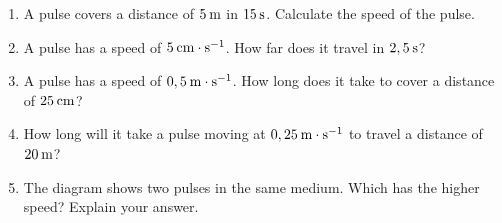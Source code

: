         \label{m38801*id313813}\begin{enumerate}[noitemsep, label=\textbf{\arabic*}. ] 
            \label{m38801*uid7}\item A pulse covers a distance of \begin{math}5\phantom{\rule{2pt}{0ex}}\mathrm{m}\end{math} in \begin{math}15\phantom{\rule{2pt}{0ex}}\mathrm{s}\end{math}. Calculate the speed of the pulse.\newline
            
\label{m38801*uid8}\item A pulse has a speed of \begin{math}5\phantom{\rule{2pt}{0ex}}\mathrm{cm}\ensuremath{\cdot}\mathrm{s}{}^{-1}\end{math}. How far does it travel in \begin{math}2,5\phantom{\rule{2pt}{0ex}}\mathrm{s}\end{math}?\newline
            
\label{m38801*uid9}\item A pulse has a speed of \begin{math}0,5\phantom{\rule{2pt}{0ex}}\mathrm{m}\ensuremath{\cdot}\mathrm{s}{}^{-1}\end{math}. How long does it take to cover a distance of \begin{math}25\phantom{\rule{2pt}{0ex}}\mathrm{cm}\end{math}?\newline
            
\label{m38801*uid10}\item How long will it take a pulse moving at \begin{math}0,25\phantom{\rule{2pt}{0ex}}\mathrm{m}\ensuremath{\cdot}\mathrm{s}{}^{-1}\end{math} to travel a distance of \begin{math}20\phantom{\rule{2pt}{0ex}}\mathrm{m}\end{math}?\newline
            
\label{m38801*uid11}\item The diagram shows two pulses in the same medium. Which has the higher speed? Explain your answer.

    \setcounter{subfigure}{0}



\end{enumerate}

